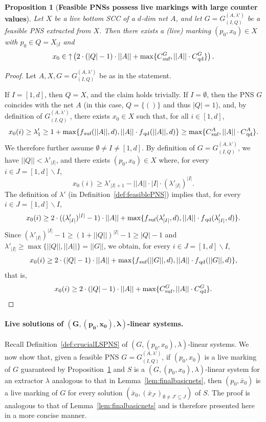 \documentclass[11pt,a4paper]{amsart}
\newcommand{\nnorm}[1]{||#1||}
\newcommand{\upC}[1]{\mathop{\uparrow}#1}
\newcommand{\suf}{{}_\textnormal{suf}}
\newcommand{\qd}{{}_\textnormal{qd}}
\newcommand{\restr}[1]{_{|{#1}}}
\theoremstyle{plain}
\newtheorem{prop}[thm]{Proposition}
\theoremstyle{definition}
\theoremstyle{defC}
\theoremstyle{thmC}
\begin{document}
\begin{prop}[\textbf{Feasible PNSs possess live markings with
	large counter values}]\label{prop:feasiblelive}
	Let $X$ be a live bottom SCC of
	a $d$-dim net $A$, 
and let $G=G_{(I,Q)}^{(A,\lambda')}$ be a feasible PNS extracted from
	$X$.
Then there exists  a (live)	marking
	$(p_0,x_0)\in X$ with $p_0\in Q=X\restr{I}$ and
	\[x_0\in\upC{\left(
2\cdot(|Q|-1)\cdot\nnorm{A}+
		\max\{C\suf^G,\nnorm{A}\cdot C\qd^G\}\right)}.\]
\end{prop}	
\begin{proof}
Let $A,X,G=G_{(I,Q)}^{(A,\lambda')}$ be as in the statement.

		If $I=[1,d]$, then $Q=X$, and the claim holds
		trivially.
	If $I=\emptyset$, then the PNS $G$ coincides with the net $A$
	(in this case, $Q=\{()\}$ and thus $|Q|=1$), and, by
	definition of $G_{(I,Q)}^{(A,\lambda')}$, 
	there exists $x_0\in X$ such that, for all
	$i\in[1,d]$,
	\[x_0(i)\geq 	\lambda'_1\geq
	1+\max\{f\suf(\nnorm{A},d),\nnorm{A}\cdot
			f\qd(\nnorm{A},d)\}\geq
 \max\{C\suf^A,\nnorm{A}\cdot
	C\qd^A\}.\]
	We therefore further assume $\emptyset\neq I\neq [1,d]$.
By definition of $G=G_{(I,Q)}^{(A,\lambda')}$,
we have $\nnorm{Q}<\lambda'_{|I|}$, and there exists $(p_0,x_0)\in X$
	where, for every
	$i\in J=[1,d]\smallsetminus I$, 
\[x_0(i)\geq\lambda'_{|I|+1}-\nnorm{A}\cdot
	|I|\cdot(\lambda'_{|I|})^{|I|}.\]
	The definition of $\lambda'$ (in
	Definition~\ref{def:feasiblePNS}) implies that,  for every
	$i\in J=[1,d]\smallsetminus I$, 
	\[x_0(i)\geq
	2\cdot((\lambda'_{|I|})^{|I|}-1)\cdot\nnorm{A}+
		\max\{f\suf(\lambda'_{|I|},d),\nnorm{A}\cdot
		f\qd(\lambda'_{|I|},d)\}.\]
	Since $(\lambda'_{|I|})^{|I|}-1\geq (1+\nnorm{Q})^{|I|}-1\geq
	|Q|-1$ and $\lambda'_{|I|}\geq
	\max\{\nnorm{Q},\nnorm{A}\}=\nnorm{G}$,
	we obtain,  for every
	$i\in J=[1,d]\smallsetminus I$, 
	\[x_0(i)\geq
	2\cdot(|Q|-1)\cdot\nnorm{A}+
		\max\{f\suf(\nnorm{G},d),\nnorm{A}\cdot
		f\qd(\nnorm{G},d)\},\]
that is,
	\[x_0(i)\geq
2\cdot(|Q|-1)\cdot\nnorm{A}+
		\max\{C\suf^G,\nnorm{A}\cdot C\qd^G\}.\qedhere\]
\end{proof}	


\paragraph{Live solutions of $\bm{(G,(p_0,x_0),\lambda)}$-linear systems.}
Recall Definition~\ref{def:crucialLSPNS} of $(G,(p_0,x_0),\lambda)$-linear systems.
We now show that, given a feasible PNS $G=G^{(A,\lambda')}_{(I,Q)}$,
if $(p_0,x_0)$ is a live marking of $G$ guaranteed by
Proposition~\ref{prop:feasiblelive}
and $S$ is a $(G,(p_0,x_0),\lambda)$-linear system for an extractor
$\lambda$ analogous to that in Lemma~\ref{lem:finalbasicnets},
then $(p_0,\bar{x}_0)$ is a live marking of $G$ 
for every solution
$(\bar{x}_0,(\bar{x}_{J'})_{\emptyset\neq J'\subseteq J})$
of $S$.
The proof is analogous to that of Lemma~\ref{lem:finalbasicnets} and
is therefore presented here in a more concise manner.
\end{document}
